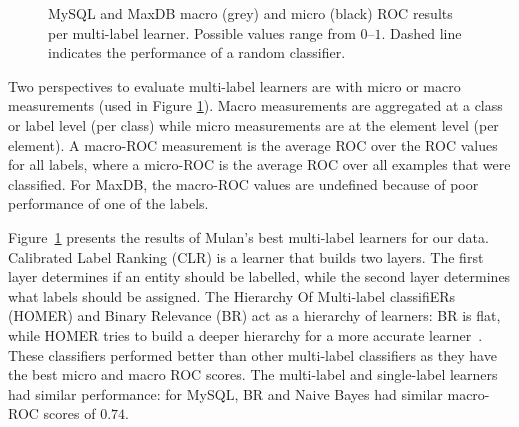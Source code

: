 \documentclass[smallextended]{svjour3}       %
\begin{document}
\begin{figure}[t]
\centering
{}
\caption[]{MySQL and MaxDB macro (grey) and micro (black) ROC results per multi-label learner. Possible values range from $0$--$1$.  Dashed line
indicates the performance of a random classifier.
}
\label{fig:mulan}
\end{figure}


Two perspectives to evaluate multi-label learners are with micro or macro measurements (used in Figure \ref{fig:mulan}).
Macro measurements are aggregated at a class or label level (per class) while micro measurements are at the element level (per element).
A macro-ROC measurement is the average ROC over the ROC values for all labels, where a micro-ROC is the average ROC over all examples that were classified. 
For MaxDB, the macro-ROC values are undefined because of poor performance of one of the labels.%

Figure~\ref{fig:mulan} presents the results of Mulan's best multi-label learners for our data. 
Calibrated Label Ranking (CLR) is a learner that builds two layers. The first layer determines if an entity should be labelled, while the second layer
determines what labels should be assigned.
The Hierarchy Of Multi-label classifiERs (HOMER) and Binary Relevance (BR) act as a hierarchy of learners: BR is flat, while HOMER tries to build a
deeper hierarchy for a more accurate learner~\cite{mulan}. 
These classifiers performed better than other multi-label classifiers as they have the best micro and macro ROC scores. 
The multi-label and single-label learners had similar performance: for
MySQL, BR and Naive Bayes had similar macro-ROC scores of $0.74$.
\end{document}
